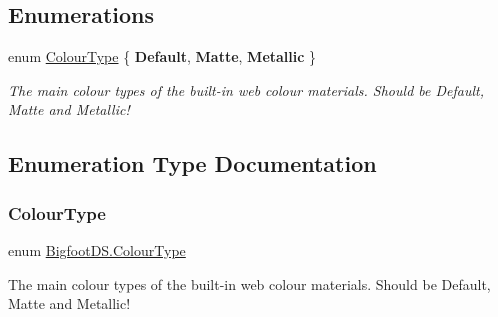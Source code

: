\subsection*{Enumerations}
\begin{DoxyCompactItemize}
\item 
enum \mbox{\hyperlink{namespace_bigfoot_d_s_abbe5e74a13ceee1200fe8df86775491b}{Colour\+Type}} \{ {\bfseries Default}, 
{\bfseries Matte}, 
{\bfseries Metallic}
 \}
\begin{DoxyCompactList}\small\item\em The main colour types of the built-\/in web colour materials. Should be Default, Matte and Metallic! \end{DoxyCompactList}\end{DoxyCompactItemize}


\subsection{Enumeration Type Documentation}
\mbox{\label{namespace_bigfoot_d_s_abbe5e74a13ceee1200fe8df86775491b}} 
\subsubsection{\texorpdfstring{Colour\+Type}{ColourType}}
{\footnotesize\ttfamily enum \mbox{\hyperlink{namespace_bigfoot_d_s_abbe5e74a13ceee1200fe8df86775491b}{Bigfoot\+D\+S.\+Colour\+Type}}\hspace{0.3cm}{\ttfamily [strong]}}



The main colour types of the built-\/in web colour materials. Should be Default, Matte and Metallic! 

